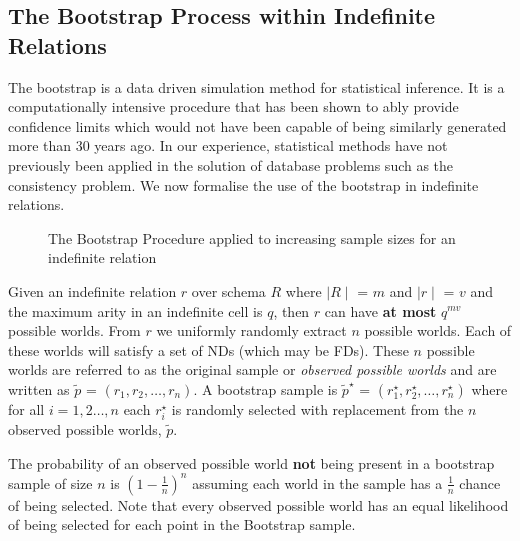 \subsection{The Bootstrap Process within Indefinite Relations}

The bootstrap \cite{et93} is a data driven simulation method for
statistical inference. It is a computationally intensive procedure
that has been shown to ably provide confidence limits which would not have
been capable of being similarly generated more than 30 years ago.
In our experience, statistical methods have not previously been 
applied in the solution of database problems such as the consistency problem.
We now formalise the use of the bootstrap in indefinite relations.
\medskip

\begin{figure}[ht]
\centerline{}
\caption{\label{fig:inc_boot} The Bootstrap Procedure applied to
increasing sample sizes for an indefinite relation }
\end{figure}


\begin{definition}
\begin{rm}
Given an indefinite relation $r$ over schema $R$ where $\mid R \mid$ =
$m$ and $\mid r \mid$ = $v$ and the maximum arity in an
indefinite cell is $q$, then $r$ can have {\bf at most} $q^{mv}$ possible
worlds.  From $r$ we uniformly randomly extract $n$ possible worlds.
Each of these worlds will satisfy a set of NDs (which may be FDs). These $n$ possible
worlds are referred to as the original sample or {\em observed possible 
worlds }
and are written as {\bf $\tilde{p}$} = $(r_1, r_2, \ldots, r_n)$. A
bootstrap sample is {\bf $\tilde{p}^\star$} = $(r_1^\star, r_2^\star, \ldots, r_n^\star )$ where for all $i = 1,2 \ldots, n$ each $r_i^\star$ is randomly
selected with replacement from the $n$ observed possible worlds,
{\bf $\tilde{p}$}.
\end{rm}
\end{definition}

The probability of an observed possible world {\bf not} being
present in a bootstrap sample of size $n$ is $(1 - \frac{1}{n})^n$
assuming each world in the sample has a $\frac{1}{n}$ chance of being
selected.  Note that
every observed possible world has an equal likelihood of being 
selected for each point in the Bootstrap sample. 

\medskip

